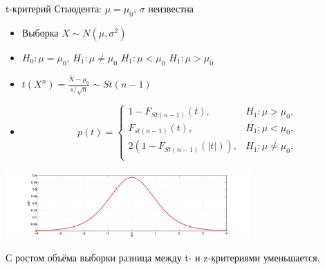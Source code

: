 \documentclass[11pt,pdf,utf8,hyperref={unicode},aspectratio=169]{beamer}
\begin{document}
\begin{frame}[label=ttest1]{\hyperlink{onesample}{} t-критерий Стьюдента: $\mu=\mu_0$, $\sigma$ неизвестна }

    \begin{itemize}
    \item Выборка $X \sim N\left(\mu, \sigma^2\right)$
    \item $H_0\colon \mu=\mu_0$,
    \qquad
    $H_1\colon \mu \neq \mu_0$
    \quad
    $H_1\colon \mu < \mu_0$
    \quad
    $H_1\colon \mu  > \mu_0$
    \item {}\qquad
    \alert{$\displaystyle
        t\left(X^n\right) = \frac{\bar{X}-\mu_0}{s/\sqrt{n}}  \sim St(n-1)
        $}
    \item {}
    $$
    p\left(t\right) = \begin{cases}
        1-F_{St(n-1)}(t), & H_1 \colon \mu>\mu_0, \\
        F_{st(n-1)}(t), & H_1 \colon \mu < \mu_0, \\
        2\left(1-F_{St(n-1)}(|t|)\right), & H_1 \colon \mu\neq\mu_0. \\
    \end{cases}
    $$
\end{itemize}
  \centering
  \includegraphics[width=0.7\textwidth]{stud.png}

    С ростом объёма выборки разница между t- и z-критериями уменьшается.
\end{frame}
\end{document}
